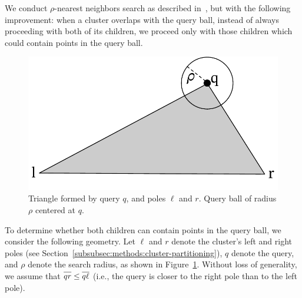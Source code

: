 We conduct $\rho$-nearest neighbors search as described in~\cite{ishaq2019clustered}, but with the following improvement:
when a cluster overlaps with the query ball, instead of always proceeding with both of its children, we proceed only with those children which could contain points in the query ball. 


\begin{figure}[ht!]
    \centering
    \includegraphics[scale=0.5]{images/geometry/overlapping-children-1.pdf}
    \caption{
        Triangle formed by query $q$, and poles $\ell$ and $r$. Query ball of radius $\rho$ centered at $q$. 
    }
    \label{fig:methods:overlapping-children-1}
\end{figure}


To determine whether both children can contain points in the query ball, we consider the following geometry. 
Let $\ell$ and $r$ denote the cluster's left and right poles (see Section~\ref{subsubsec:methods:cluster-partitioning}), $q$ denote the query, and $\rho$ denote the search radius, as shown in Figure~\ref{fig:methods:overlapping-children-1}.
Without loss of generality, we assume that $\overline{qr \vphantom \ell} \leq \overline{q\ell}$ (i.e., the query is closer to the right pole than to the left pole). 


